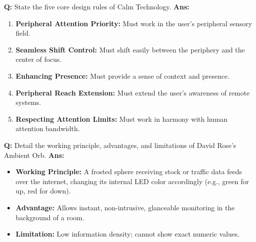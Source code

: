 \documentclass[10pt,a4paper,twocolumn]{article}
\begin{document}
\begin{tcolorbox}[
  colback=white,
  colframe=UnitColorTwo,
  colbacktitle=gray!10!white,
  coltitle=black,
  fonttitle=\bfseries\sffamily\small,
  title={Unit II $\bullet$ Card 4},
  boxrule=1.2pt,
  arc=2mm,
  outer arc=2mm,
  boxsep=1.5mm,
  top=1mm,
  bottom=1mm,
  left=1.5mm,
  right=1.5mm,
  before skip=2.5mm,
  after skip=2.5mm
]
\textbf{Q:} State the five core design rules of Calm Technology.
\tcbline
\textbf{Ans:} \begin{enumerate}
  \item \textbf{Peripheral Attention Priority:} Must work in the user's peripheral sensory field.
  \item \textbf{Seamless Shift Control:} Must shift easily between the periphery and the center of focus.
  \item \textbf{Enhancing Presence:} Must provide a sense of context and presence.
  \item \textbf{Peripheral Reach Extension:} Must extend the user's awareness of remote systems.
  \item \textbf{Respecting Attention Limits:} Must work in harmony with human attention bandwidth.
\end{enumerate}
\end{tcolorbox}


\begin{tcolorbox}[
  colback=white,
  colframe=UnitColorTwo,
  colbacktitle=gray!10!white,
  coltitle=black,
  fonttitle=\bfseries\sffamily\small,
  title={Unit II $\bullet$ Card 5},
  boxrule=1.2pt,
  arc=2mm,
  outer arc=2mm,
  boxsep=1.5mm,
  top=1mm,
  bottom=1mm,
  left=1.5mm,
  right=1.5mm,
  before skip=2.5mm,
  after skip=2.5mm
]
\textbf{Q:} Detail the working principle, advantages, and limitations of David Rose's Ambient Orb.
\tcbline
\textbf{Ans:} \begin{itemize}
  \item   \textbf{Working Principle:} A frosted sphere receiving stock or traffic data feeds over the internet, changing its internal LED color accordingly (e.g., green for up, red for down).
  \item   \textbf{Advantage:} Allows instant, non-intrusive, glanceable monitoring in the background of a room.
  \item   \textbf{Limitation:} Low information density; cannot show exact numeric values.
\end{itemize}
\end{tcolorbox}
\end{document}
